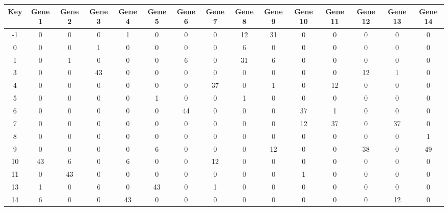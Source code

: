 \begin{tabular}{|c|c|c|c|c|c|c|c|c|c|c|c|c|c|c|}
\hline
Key & Gene 1 & Gene 2 & Gene 3 & Gene 4 & Gene 5 & Gene 6 & Gene 7 & Gene 8 & Gene 9 & Gene 10 & Gene 11 & Gene 12 & Gene 13 & Gene 14 \\
\hline
-1 & 0 & 0 & 0 & 1 & 0 & 0 & 0 & 12 & 31 & 0 & 0 & 0 & 0 & 0 \\
0 & 0 & 0 & 1 & 0 & 0 & 0 & 0 & 6 & 0 & 0 & 0 & 0 & 0 & 0 \\
1 & 0 & 1 & 0 & 0 & 0 & 6 & 0 & 31 & 6 & 0 & 0 & 0 & 0 & 0 \\
3 & 0 & 0 & 43 & 0 & 0 & 0 & 0 & 0 & 0 & 0 & 0 & 12 & 1 & 0 \\
4 & 0 & 0 & 0 & 0 & 0 & 0 & 37 & 0 & 1 & 0 & 12 & 0 & 0 & 0 \\
5 & 0 & 0 & 0 & 0 & 1 & 0 & 0 & 1 & 0 & 0 & 0 & 0 & 0 & 0 \\
6 & 0 & 0 & 0 & 0 & 0 & 44 & 0 & 0 & 0 & 37 & 1 & 0 & 0 & 0 \\
7 & 0 & 0 & 0 & 0 & 0 & 0 & 0 & 0 & 0 & 12 & 37 & 0 & 37 & 0 \\
8 & 0 & 0 & 0 & 0 & 0 & 0 & 0 & 0 & 0 & 0 & 0 & 0 & 0 & 1 \\
9 & 0 & 0 & 0 & 0 & 6 & 0 & 0 & 0 & 12 & 0 & 0 & 38 & 0 & 49 \\
10 & 43 & 6 & 0 & 6 & 0 & 0 & 12 & 0 & 0 & 0 & 0 & 0 & 0 & 0 \\
11 & 0 & 43 & 0 & 0 & 0 & 0 & 0 & 0 & 0 & 1 & 0 & 0 & 0 & 0 \\
13 & 1 & 0 & 6 & 0 & 43 & 0 & 1 & 0 & 0 & 0 & 0 & 0 & 0 & 0 \\
14 & 6 & 0 & 0 & 43 & 0 & 0 & 0 & 0 & 0 & 0 & 0 & 0 & 12 & 0 \\
\hline
\end{tabular}
